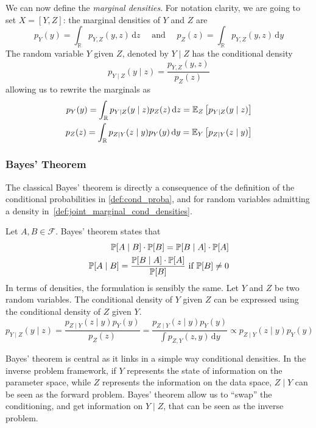 \documentclass[../../Main_ManuscritThese.tex]{subfiles}
\begin{document}
\begin{definition}
  We can now define the \emph{marginal densities}.
  For notation clarity, we are going to set $X = [Y,Z]$: the marginal densities of $Y$ and $Z$ are
  \begin{equation}
    \label{eq:marginals_def}
    p_{Y}(y) = \int_{\mathbb{R}}p_{Y,Z}(y,z) \,\mathrm{d}z \quad \text{ and } \quad p_{Z}(z) = \int_{\mathbb{R}}p_{Y,Z}(y,z) \,\mathrm{d}y
  \end{equation}
  The random variable $Y$ given $Z$, denoted by $Y \mid Z$ has the conditional density
  \begin{equation}
    p_{Y \mid Z}(y \mid z) = \frac{p_{Y,Z}(y,z)}{p_Z(z)}
  \end{equation}
  allowing us to rewrite the marginals as
  \begin{align}
    \label{eq:marginal_conditioned}
        p_{Y}(y) = \int_{\mathbb{R}}p_{Y\mid Z}(y\mid z)p_Z(z) \,\mathrm{d}z=\mathbb{E}_Z\left[p_{Y\mid Z}(y\mid z)\right] \\ p_{Z}(z) = \int_{\mathbb{R}}p_{Z\mid Y}(z\mid y)p_Y(y) \,\mathrm{d}y = \mathbb{E}_{Y}\left[p_{Z\mid Y}(z\mid y)\right]
  \end{align}

\end{definition}

\subsubsection{Bayes' Theorem}
\label{ssec:bayes_theorem}

The classical Bayes' theorem is directly a consequence of the definition of the conditional probabilities in \cref{def:cond_proba}, and for random variables admitting a density in~\cref{def:joint_marginal_cond_densities}.

\begin{theorem}
  Let $A, B\in\mathcal{F}$. Bayes' theorem states that
  \begin{align*}
    \mathbb{P}[A\mid B]\cdot \mathbb{P}[B] = \mathbb{P}[B \mid A]\cdot\mathbb{P}[A] \\
    \mathbb{P}[A \mid B] = \frac{\mathbb{P}[B \mid A]\cdot\mathbb{P}[A]}{\mathbb{P}[B]} \text{ if } \mathbb{P}[B] \neq 0
  \end{align*}
 In terms of densities, the formulation is sensibly the same.
  Let $Y$ and $Z$ be two random variables. The conditional density of $Y$ given $Z$ can be expressed using the conditional density of $Z$ given $Y$.
  \begin{equation}
    p_{Y\mid Z}(y \mid z) = \frac{p_{Z\mid Y}(z\mid y) p_Y(y)}{p_Z(z)} = \frac{p_{Z\mid Y}(z\mid y) p_Y(y)}{\int p_{Z,Y}(z,y) \,\mathrm{d}y}  \propto p_{Z\mid Y}(z\mid y) p_Y(y)
  \end{equation}
\end{theorem}
Bayes' theorem is central as it links in a simple way conditional densities. In the inverse problem framework, if $Y$ represents the state of information on the parameter space, while $Z$ represents the information on the data space, $Z\mid Y$ can be seen as the forward problem. Bayes' theorem allow us to ``swap'' the conditioning, and get information on $Y\mid Z$, that can be seen as the inverse problem.
\end{document}
